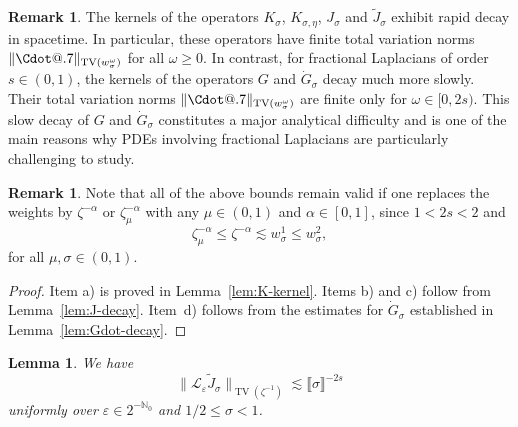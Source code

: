 \documentclass{article}
\makeatletter
\numberwithin{equation}{section}
\newcommand*\Cdot{{\mathpalette\Cdot@{.7}}}
\newcommand*\Cdot@[2]{\mathbin{\vcenter{\hbox{\scalebox{#2}{\hspace{0.1mm}$\m@th#1\bullet$\hspace{0.1mm}}}}}}
\theoremstyle{plain}
\newtheorem{lemma}[theorem]{Lemma}
\theoremstyle{definition}
\newtheorem{remark}[theorem]{Remark}
\makeatother
\begin{document}
\begin{remark}
  \label{rem:decay-rate}The kernels of the operators $K_{\sigma}$,
  $K_{\sigma, \eta}$, $J_{\sigma}$ and $\tilde{J}_{\sigma}$ exhibit rapid decay
  in spacetime. In particular, these operators have finite total variation
  norms $\| \Cdot \|_{\operatorname{TV} (w_{\sigma}^{\omega})}$ for all $\omega
  \geqslant 0$. In contrast, for fractional Laplacians of order $s \in (0,
  1)$, the kernels of the operators $G$ and $\dot{G}_{\sigma}$ decay much more
  slowly. Their total variation norms $\| \Cdot \|_{\operatorname{TV}
  (w_{\sigma}^{\omega})}$ are finite only for $\omega \in [0, 2 s)$. This slow
  decay of $G$ and $\dot{G}_{\sigma}$ constitutes a major analytical
  difficulty and is one of the main reasons why PDEs involving fractional
  Laplacians are particularly challenging to study.
\end{remark}

\begin{remark}
  \label{rem:weights-zeta-w}Note that all of the above bounds remain valid if
  one replaces the weights by $\zeta^{- \alpha}$ or $\zeta^{- \alpha}_{\mu}$
  with any $\mu \in (0, 1)$ and $\alpha \in [0, 1]$, since $1 < 2 s < 2$ and
  \[ \zeta^{- \alpha}_{\mu} \leqslant \zeta^{- \alpha} {\lesssim w^1_{\sigma}}
     {{\leqslant w^2_{\sigma}} } , \]
  for all $\mu, \sigma \in (0, 1)$.
\end{remark}

\begin{proof}
  Item a) is proved in Lemma~\ref{lem:K-kernel}. Items b) and c) follow from
  Lemma~\ref{lem:J-decay}. Item~d) follows from the estimates for
  $\dot{G}_{\sigma}$ established in Lemma~\ref{lem:Gdot-decay}.
\end{proof}

\begin{lemma}
  \label{lem:bound-L-J}We have
  \[ \| \mathcal{L}_{\varepsilon} \tilde{J}_{\sigma} \|_{\operatorname{TV} \left(
     {\zeta^{- 1}}  \right)} \lesssim \llbracket \sigma \rrbracket^{- 2 s} \]
  uniformly over $\varepsilon \in 2^{-\mathbb{N}_0}$ and $1 / 2 \leqslant
  \sigma < 1$.
\end{lemma}
\end{document}
